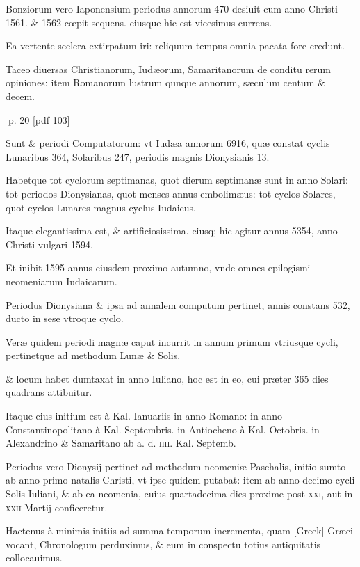 \begin{parnumbers}
Bonziorum vero Iaponensium periodus annorum 470 desiuit cum anno Christi 1561. \& 1562 cœpit sequens. eiusque hic est vicesimus currens.

Ea vertente scelera extirpatum iri: reliquum tempus omnia pacata fore credunt.

Taceo diuersas Christianorum, Iudæorum, Samaritanorum de conditu rerum opiniones: item Romanorum lustrum qunque annorum, sæculum centum \& decem.

\end{parnumbers}
\clearpage
p. 20 [pdf 103]

\begin{parnumbers}

Sunt \& periodi Computatorum: vt Iudæa  annorum 6916, quæ constat cyclis Lunaribus 364, Solaribus 247, periodis magnis Dionysianis 13.

Habetque tot cyclorum septimanas, quot dierum septimanæ sunt in anno Solari: tot periodos Dionysianas, quot menses annus embolimæus: tot cyclos Solares, quot cyclos Lunares magnus cyclus Iudaicus.

Itaque elegantissima est, \& artificiosissima. eiusq; hic agitur annus 5354, anno Christi vulgari 1594.

Et inibit 1595 annus eiusdem proximo autumno, vnde omnes epilogismi neomeniarum Iudaicarum.

Periodus Dionysiana \& ipsa ad annalem computum pertinet, annis constans 532, ducto in sese vtroque cyclo.

Veræ quidem periodi magnæ caput incurrit in annum primum vtriusque cycli, pertinetque ad methodum Lunæ \& Solis. 

\& locum habet dumtaxat in anno Iuliano, hoc est in eo, cui præter 365 dies quadrans attibuitur.

Itaque eius initium est à Kal. Ianuariis in anno Romano: in anno Constantinopolitano à Kal. Septembris. in Antiocheno à Kal. Octobris. in Alexandrino \& Samaritano ab a. d. \textsc{iiii}. Kal. Septemb.

Periodus vero Dionysij pertinet ad methodum neomeniæ Paschalis, initio sumto ab anno primo natalis Christi, vt ipse quidem putabat: item ab anno decimo cycli Solis Iuliani, \& ab ea neomenia, cuius quartadecima dies proxime post \textsc{xxi}, aut in \textsc{xxii} Martij conficeretur.

Hactenus à minimis initiis ad summa temporum incrementa, quam \textgreek{[Greek]} Græci vocant, Chronologum perduximus, \& eum in conspectu totius antiquitatis collocauimus.


\end{parnumbers}
